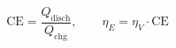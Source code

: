\documentclass[preview]{standalone}
\begin{document}
\[\text{CE} = \frac{Q_\text{disch}}{Q_\text{chg}}, \qquad \eta_E = \eta_V \cdot \text{CE}\]
\end{document}
